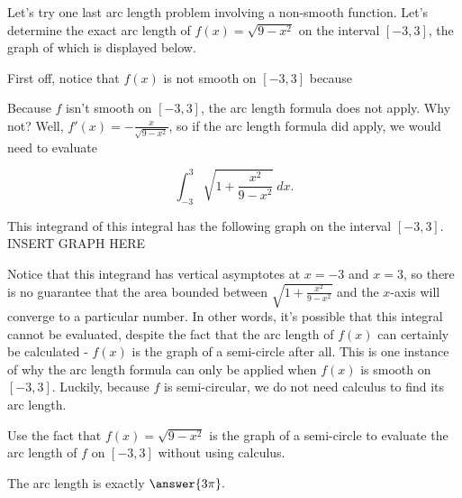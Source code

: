 \documentclass[handout,nooutcomes]{ximera}
\begin{document}

Let's try one last arc length problem involving a non-smooth function.  Let's determine the exact arc length of $f(x) = \sqrt{9-x^2}$ on the interval $[-3,3]$, the graph of which is displayed below.

\begin{problem}
First off, notice that $f(x)$ is not smooth on $[-3,3]$ because 
\begin{selectAll}
\end{selectAll}
\end{problem}

Because $f$ isn't smooth on $[-3,3]$, the arc length formula does not apply.  Why not?  Well, $f'(x) = -\frac{x}{\sqrt{9-x^2}}$, so if the arc length formula did apply, we would need to evaluate 

$$\displaystyle\int_{-3}^{3} \sqrt{1+\frac{x^2}{9-x^2}} \ dx.$$ 

This integrand of this integral has the following graph on the interval $[-3,3].$  \\

INSERT GRAPH HERE

Notice that this integrand has vertical asymptotes at $x=-3$ and $x=3$, so there is no guarantee that the area bounded between $\sqrt{1+\frac{x^2}{9-x^2}}$ and the $x$-axis will converge to a particular number.  In other words, it's possible that this integral cannot be evaluated, despite the fact that the arc length of $f(x)$ can certainly be calculated - $f(x)$ is the graph of a semi-circle after all.  This is one instance of why the arc length formula can only be applied when $f(x)$ is smooth on $[-3,3]$.  Luckily, because $f$ is semi-circular, we do not need calculus to find its arc length. 

\begin{problem}
Use the fact that $f(x) = \sqrt{9-x^2}$ is the graph of a semi-circle to evaluate the arc length of $f$ on $[-3,3]$ without using calculus.  

The arc length is exactly $\answer{3\pi}.$
\end{problem}
\end{document}
